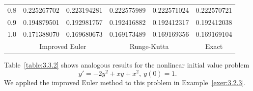 \begin{examplesolution}
\begin{newtable}
\begin{center}
\begin{tabular}{|c|r|r|r|r|r|}
      0.8                       & 0.225267702                         & 0.223194281                      & 0.222575989                   & 0.222571024                    & 0.222570721                 \\
      0.9                       & 0.194879501                         & 0.192981757                      & 0.192416882                   & 0.192412317                    & 0.192412038                 \\
      1.0                       & 0.171388070                         & 0.169680673                      & 0.169173489                   & 0.169169356                    & 0.169169104                 \\
      \hline
                                & \multicolumn{2}{c|}{Improved Euler} & \multicolumn{2}{c|}{Runge-Kutta} & \multicolumn{1}{c|}{Exact}     \\
      \hline
    \end{tabular}
  \end{center}
\end{newtable}
\end{examplesolution}

\begin{example}
  \label{example:3.3.3} \rm Table~\ref{table:3.3.2} shows analogous results for the nonlinear
  initial value problem
  \[
    y'=-2y^{2}+xy+x^{2},\ y(0)=1.
  \]
  We applied the improved Euler method to this problem in Example~\ref{exer:3.2.3}.
\end{example}

